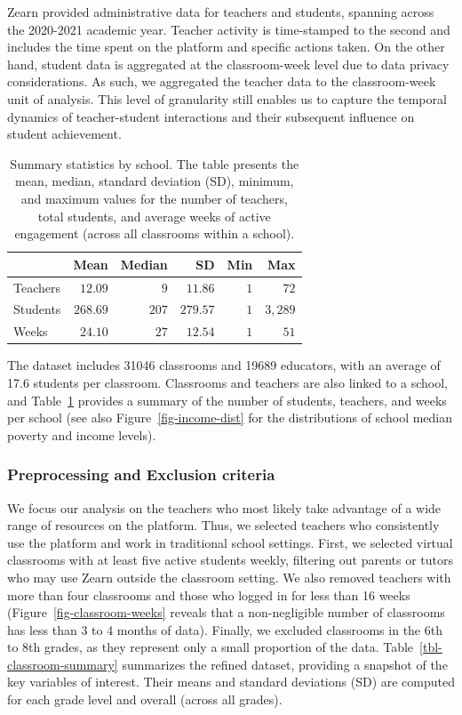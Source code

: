 \documentclass[
  number,
  preprint,
  3p,
  onecolumn]{elsarticle}
\begin{document}
Zearn provided administrative data for teachers and students, spanning
across the 2020-2021 academic year. Teacher activity is time-stamped to
the second and includes the time spent on the platform and specific
actions taken. On the other hand, student data is aggregated at the
classroom-week level due to data privacy considerations. As such, we
aggregated the teacher data to the classroom-week unit of analysis. This
level of granularity still enables us to capture the temporal dynamics
of teacher-student interactions and their subsequent influence on
student achievement.

\begin{longtable}{l|rrrrr}

\caption{\label{tbl-summary}Summary statistics by school. The table
presents the mean, median, standard deviation (SD), minimum, and maximum
values for the number of teachers, total students, and average weeks of
active engagement (across all classrooms within a school).}

\tabularnewline

\toprule
\multicolumn{1}{l}{} & Mean & Median & SD & Min & Max \\ 
\midrule\addlinespace[2.5pt]
Teachers & $12.09$ & $9$ & $11.86$ & $1$ & $72$ \\ 
Students & $268.69$ & $207$ & $279.57$ & $1$ & $3,289$ \\ 
Weeks & $24.10$ & $27$ & $12.54$ & $1$ & $51$ \\ 
\bottomrule

\end{longtable}

The dataset includes 31046 classrooms and 19689 educators, with an
average of 17.6 students per classroom. Classrooms and teachers are also
linked to a school, and Table~\ref{tbl-summary} provides a summary of
the number of students, teachers, and weeks per school (see also
Figure~\ref{fig-income-dist} for the distributions of school median
poverty and income levels).

\subsubsection{Preprocessing and Exclusion
criteria}\label{preprocessing-and-exclusion-criteria}

We focus our analysis on the teachers who most likely take advantage of
a wide range of resources on the platform. Thus, we selected teachers
who consistently use the platform and work in traditional school
settings. First, we selected virtual classrooms with at least five
active students weekly, filtering out parents or tutors who may use
Zearn outside the classroom setting. We also removed teachers with more
than four classrooms and those who logged in for less than 16 weeks
(Figure~\ref{fig-classroom-weeks} reveals that a non-negligible number
of classrooms has less than 3 to 4 months of data). Finally, we excluded
classrooms in the 6th to 8th grades, as they represent only a small
proportion of the data. Table~\ref{tbl-classroom-summary} summarizes the
refined dataset, providing a snapshot of the key variables of interest.
Their means and standard deviations (SD) are computed for each grade
level and overall (across all grades).
\end{document}
